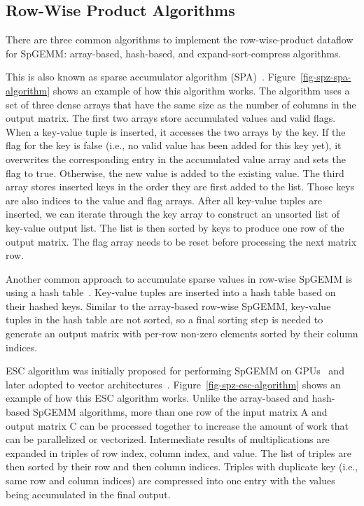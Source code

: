 
\subsection{Row-Wise Product Algorithms}

There are three common algorithms to implement the row-wise-product dataflow
for SpGEMM: array-based, hash-based, and expand-sort-compress algorithms.


This is also known as sparse accumulator algorithm
(SPA)~\cite{gilbert-sparse-matlab-1992}.
Figure~\ref{fig-spz-spa-algorithm} shows an example of how this algorithm
works.
The algorithm uses a set of three dense arrays that have the same size as the
number of columns in the output matrix.
The first two arrays store accumulated values and valid flags.
When a key-value tuple is inserted, it accesses the two arrays by the key.
If the flag for the key is false (i.e., no valid value has been added for this
key yet), it overwrites the corresponding entry in the accumulated value array
and sets the flag to true.
Otherwise, the new value is added to the existing value.
The third array stores inserted keys in the order they are first added to the
list.
Those keys are also indices to the value and flag arrays.
After all key-value tuples are inserted, we can iterate through the key array
to construct an unsorted list of key-value output list.
The list is then sorted by keys to produce one row of the output matrix.
The flag array needs to be reset before processing the next matrix row.

Another common approach to accumulate sparse values in row-wise SpGEMM is using
a hash table~\cite{anh-hash-spgemm-2016,deveci-multithreaded-spgemm-2018}.
Key-value tuples are inserted into a hash table based on their hashed keys.
Similar to the array-based row-wise SpGEMM, key-value tuples in the hash table
are not sorted, so a final sorting step is needed to generate an output matrix
with per-row non-zero elements sorted by their column indices.


ESC algorithm was initially proposed for performing SpGEMM on
GPUs~\cite{dalton-spgemm-gpu-2015,winter-adaptive-spgemm-gpu-ppopp2019} and
later adopted to vector
architectures~\cite{fevre-spgemm-rvv-2023,li-spgemm-vector-arch-mchpc2019}.
Figure~\ref{fig-spz-esc-algorithm} shows an example of how this ESC algorithm
works.
Unlike the array-based and hash-based SpGEMM algorithms, more than one row of
the input matrix A and output matrix C can be processed together to increase
the amount of work that can be parallelized or vectorized.
Intermediate results of multiplications are expanded in triples of row index,
column index, and value.
The list of triples are then sorted by their row and then column indices.
Triples with duplicate key (i.e., same row and column indices) are compressed
into one entry with the values being accumulated in the final output.
